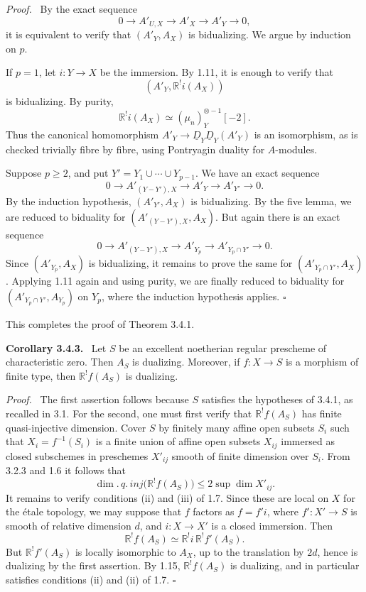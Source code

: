 \documentclass[11pt]{article}
\providecommand{\qedtext}{\hfill$\square$}
\newenvironment{statement}[1]{\par\medskip\noindent\textbf{#1.}\ }{\par\medskip}
\newenvironment{prooftext}[1][Proof]{\par\noindent\emph{#1.}\ }{\par\medskip}
\providecommand{\qedtext}{\hfill$\square$}
\begin{document}
\begin{prooftext}
By the exact sequence
\[
   0\longrightarrow A'_{U,X}\longrightarrow A'_X\longrightarrow A'_Y\longrightarrow0,
\]
it is equivalent to verify that $(A'_Y,A_X)$ is bidualizing. We argue by induction on $p$.

If $p=1$, let $i:Y\to X$ be the immersion. By 1.11, it is enough to verify that
\[
   (A'_Y,\mathbb{R}^!i(A_X))
\]
is bidualizing. By purity,
\[
   \mathbb{R}^!i(A_X)\simeq(\mu_n)^{\otimes -1}_Y[-2].
\]
Thus the canonical homomorphism $A'_Y\to\underline D_Y\underline D_Y(A'_Y)$ is an isomorphism, as is checked trivially fibre by fibre, using Pontryagin duality for $A$-modules.

Suppose $p\ge2$, and put $Y'=Y_1\cup\cdots\cup Y_{p-1}$. We have an exact sequence
\[
   0\longrightarrow A'_{(Y-Y'),X}\longrightarrow A'_Y\longrightarrow A'_{Y'}\longrightarrow0.
\]
By the induction hypothesis, $(A'_{Y'},A_X)$ is bidualizing. By the five lemma, we are reduced to biduality for $(A'_{(Y-Y'),X},A_X)$. But again there is an exact sequence
\[
   0\longrightarrow A'_{(Y-Y'),X}\longrightarrow A'_{Y_p}\longrightarrow A'_{Y_p\cap Y'}\longrightarrow0.
\]
Since $(A'_{Y_p},A_X)$ is bidualizing, it remains to prove the same for $(A'_{Y_p\cap Y'},A_X)$. Applying 1.11 again and using purity, we are finally reduced to biduality for $(A'_{Y_p\cap Y'},A_{Y_p})$ on $Y_p$, where the induction hypothesis applies. \qedtext
\end{prooftext}

This completes the proof of Theorem 3.4.1.

\begin{statement}{Corollary 3.4.3}
Let $S$ be an excellent noetherian regular prescheme of characteristic zero. Then $A_S$ is dualizing. Moreover, if $f:X\to S$ is a morphism of finite type, then $\mathbb{R}^!f(A_S)$ is dualizing.
\end{statement}

\begin{prooftext}
The first assertion follows because $S$ satisfies the hypotheses of 3.4.1, as recalled in 3.1. For the second, one must first verify that $\mathbb{R}^!f(A_S)$ has finite quasi-injective dimension. Cover $S$ by finitely many affine open subsets $S_i$ such that $X_i=f^{-1}(S_i)$ is a finite union of affine open subsets $X_{ij}$ immersed as closed subschemes in preschemes $X'_{ij}$ smooth of finite dimension over $S_i$. From 3.2.3 and 1.6 it follows that
\[
   \dim.\,q.\,inj\bigl(\mathbb{R}^!f(A_S)\bigr)
       \le 2\sup \dim X'_{ij}.
\]
It remains to verify conditions (ii) and (iii) of 1.7. Since these are local on $X$ for the étale topology, we may suppose that $f$ factors as $f=f'i$, where $f':X'\to S$ is smooth of relative dimension $d$, and $i:X\to X'$ is a closed immersion. Then
\[
   \mathbb{R}^!f(A_S)\simeq \mathbb{R}^!i\,\mathbb{R}^!f'(A_S).
\]
But $\mathbb{R}^!f'(A_S)$ is locally isomorphic to $A_{X}$, up to the translation by $2d$, hence is dualizing by the first assertion. By 1.15, $\mathbb{R}^!f(A_S)$ is dualizing, and in particular satisfies conditions (ii) and (ii) of 1.7. \qedtext
\end{prooftext}
\end{document}
